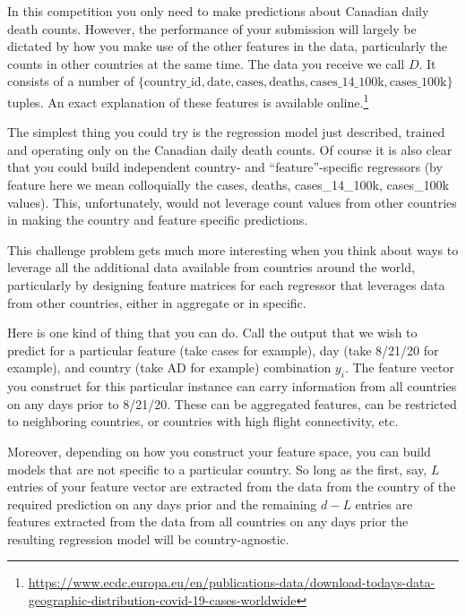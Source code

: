In this competition you only need to make predictions about Canadian daily death counts.  However, the performance of your submission will largely be dictated by how you make use of the other features in the data, particularly the counts in other countries at the same time.  
The data you receive we call $D.$ It consists of a number of $\{\mathrm{country\_id,	date, cases, deaths, cases\_14\_100k, cases\_100k}\}$ tuples.  An exact explanation of these features is available online.\footnote{\url{https://www.ecdc.europa.eu/en/publications-data/download-todays-data-geographic-distribution-covid-19-cases-worldwide}}

The simplest thing you could try is the regression model just described, trained and operating only on the Canadian daily death counts. Of course it is also clear that you could build independent country- and ``feature''-specific regressors
(by feature here we mean colloquially the cases, deaths, cases\_14\_100k, cases\_100k values).   This, unfortunately, would not leverage count values from other countries in making the country and feature specific predictions.  

This challenge problem gets much more interesting when you think about ways to leverage all the additional data available from countries around the world, particularly by designing feature matrices for each regressor that leverages data from other countries, either in aggregate or in specific. 

Here is one kind of thing that you can do.  Call the output that we wish to predict  for a particular feature (take cases for example), day (take 8/21/20 for example), and country (take AD for example) combination $y_i.$  The feature vector you construct for this particular instance can carry information from all countries on any days prior to 8/21/20.  These can be aggregated features, can be restricted to neighboring countries, or countries with high flight connectivity, etc.  

Moreover, depending on how you construct your feature space, you can build models that are not specific to a particular country.  So long as the first, say, $L$ entries of your feature vector are extracted from the data from the country of the required prediction on any days prior and the remaining $d-L$ entries are features extracted from the data from all countries on any days prior the resulting regression model will be country-agnostic.

